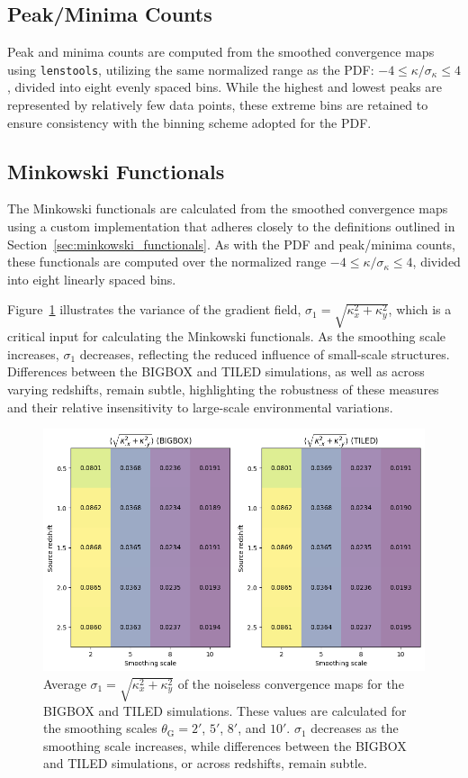 \subsection{Peak/Minima Counts}
Peak and minima counts are computed from the smoothed convergence maps using \texttt{lenstools}, utilizing the same normalized range as the PDF: $-4 \leq \kappa/\sigma_{\kappa} \leq 4$, divided into eight evenly spaced bins. While the highest and lowest peaks are represented by relatively few data points, these extreme bins are retained to ensure consistency with the binning scheme adopted for the PDF.

\subsection{Minkowski Functionals}
The Minkowski functionals are calculated from the smoothed convergence maps using a custom implementation that adheres closely to the definitions outlined in Section~\ref{sec:minkowski_functionals}. As with the PDF and peak/minima counts, these functionals are computed over the normalized range $-4 \leq \kappa/\sigma_{\kappa} \leq 4$, divided into eight linearly spaced bins.

Figure~\ref{fig:avg_sigma1} illustrates the variance of the gradient field, $\sigma_1 = \sqrt{\kappa_x^2 + \kappa_y^2}$, which is a critical input for calculating the Minkowski functionals. As the smoothing scale increases, $\sigma_1$ decreases, reflecting the reduced influence of small-scale structures. Differences between the BIGBOX and TILED simulations, as well as across varying redshifts, remain subtle, highlighting the robustness of these measures and their relative insensitivity to large-scale environmental variations.

\begin{figure}[ht]
    \centering
    \includegraphics[width=\textwidth]{figures/avg_sigma1.png}
    \caption[Average $\sigma_1 = \sqrt{\kappa_{x}^2 + \kappa_{y}^2}$ of the noiseless convergence maps]{Average \(\sigma_1 = \sqrt{\kappa_{x}^2 + \kappa_{y}^2}\) of the noiseless convergence maps for the BIGBOX and TILED simulations. These values are calculated for the smoothing scales \(\theta_{\mathrm{G}} = 2'\), \(5'\), \(8'\), and \(10'\). \(\sigma_1\) decreases as the smoothing scale increases, while differences between the BIGBOX and TILED simulations, or across redshifts, remain subtle.}
    \label{fig:avg_sigma1}
\end{figure}

